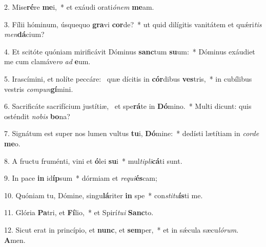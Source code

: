 2. Mise\textbf{ré}re \textbf{me}i,~*  et exáudi orati\textit{ó}\textit{nem} \textbf{me}am.\

3. Fílii hóminum, úsquequo \textbf{gra}vi \textbf{cor}de?~*  ut quid dilígitis vanitátem et quǽri\textit{tis} \textit{men}\textbf{dá}cium?\

4. Et scitóte quóniam mirificávit Dóminus \textbf{sanc}tum \textbf{su}um:~*  Dóminus exáudiet me cum clamáve\textit{ro} \textit{ad} \textbf{e}um.\

5. Irascímini, et nolíte peccáre: \dag\  quæ dícitis in \textbf{cór}dibus \textbf{ves}tris,~*  in cubílibus vestris \textit{com}\textit{pun}\textbf{gí}mini.\

6. Sacrificáte sacrifícium justítiæ, \dag\  et spe\textbf{rá}te in \textbf{Dó}mino.~*  Multi dicunt: quis osténdit \textit{no}\textit{bis} \textbf{bo}na?\

7. Signátum est super nos lumen vultus \textbf{tu}i, \textbf{Dó}mine:~*  dedísti lætítiam in \textit{cor}\textit{de} \textbf{me}o.\

8. A fructu fruménti, vini et \textbf{ó}lei \textbf{su}i~*  mul\textit{ti}\textit{pli}\textbf{cá}ti sunt.\

9. In pace \textbf{in} id\textbf{íp}sum~*  dórmiam et \textit{re}\textit{qui}\textbf{és}cam;\

10. Quóniam tu, Dómine, singu\textbf{lá}riter \textbf{in} spe~*  con\textit{sti}\textit{tu}\textbf{ís}ti me.\

11. Glória \textbf{Pa}tri, et \textbf{Fí}lio,~*  et Spirí\textit{tu}\textit{i} \textbf{Sanc}to.\

12. Sicut erat in princípio, et \textbf{nunc}, et \textbf{sem}per,~*  et in sǽcula sæcu\textit{ló}\textit{rum}. \textbf{A}men.\

